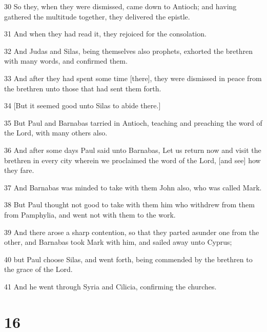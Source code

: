 \par 30 So they, when they were dismissed, came down to Antioch; and having gathered the multitude together, they delivered the epistle.
\par 31 And when they had read it, they rejoiced for the consolation.
\par 32 And Judas and Silas, being themselves also prophets, exhorted the brethren with many words, and confirmed them.
\par 33 And after they had spent some time [there], they were dismissed in peace from the brethren unto those that had sent them forth.
\par 34 [But it seemed good unto Silas to abide there.]
\par 35 But Paul and Barnabas tarried in Antioch, teaching and preaching the word of the Lord, with many others also.
\par 36 And after some days Paul said unto Barnabas, Let us return now and visit the brethren in every city wherein we proclaimed the word of the Lord, [and see] how they fare.
\par 37 And Barnabas was minded to take with them John also, who was called Mark.
\par 38 But Paul thought not good to take with them him who withdrew from them from Pamphylia, and went not with them to the work.
\par 39 And there arose a sharp contention, so that they parted asunder one from the other, and Barnabas took Mark with him, and sailed away unto Cyprus;
\par 40 but Paul choose Silas, and went forth, being commended by the brethren to the grace of the Lord.
\par 41 And he went through Syria and Cilicia, confirming the churches.

\chapter{16}

